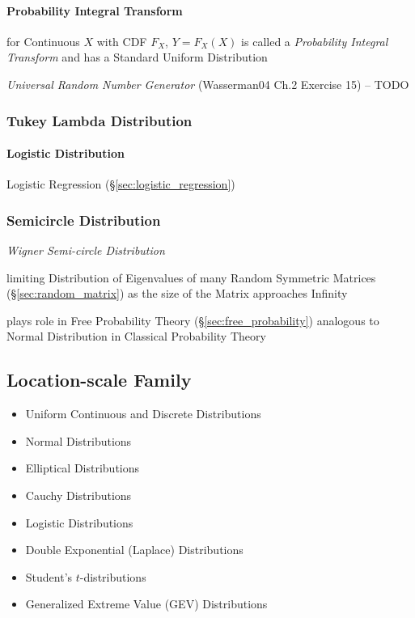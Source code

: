 \paragraph{Probability Integral Transform}
\label{sec:probability_integral_transform}\hfill

for Continuous $X$ with CDF $F_X$, $Y = F_X(X)$ is called a \emph{Probability
  Integral Transform} and has a Standard Uniform Distribution

\emph{Universal Random Number Generator} (Wasserman04 Ch.2 Exercise 15) -- TODO



\subsubsection{Tukey Lambda Distribution}\label{sec:tukey_lambda_distribution}

\paragraph{Logistic Distribution}\label{sec:logistic_distribution}\hfill

\fist Logistic Regression (\S\ref{sec:logistic_regression})



\subsubsection{Semicircle Distribution}\label{sec:semicircle_distribution}

\emph{Wigner Semi-circle Distribution}

limiting Distribution of Eigenvalues of many Random Symmetric Matrices
(\S\ref{sec:random_matrix}) as the size of the Matrix approaches Infinity

plays role in Free Probability Theory (\S\ref{sec:free_probability}) analogous
to Normal Distribution in Classical Probability Theory



\subsection{Location-scale Family}\label{sec:location_scale}

\begin{itemize}
  \item Uniform Continuous and Discrete Distributions
  \item Normal Distributions
  \item Elliptical Distributions
  \item Cauchy Distributions
  \item Logistic Distributions
  \item Double Exponential (Laplace) Distributions
  \item Student's $t$-distributions
  \item Generalized Extreme Value (GEV) Distributions
\end{itemize}


